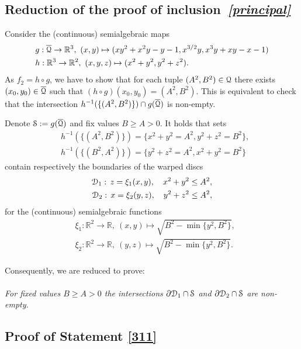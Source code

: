 \documentclass[10pt,twoside]{homg3} %
\newcommand{\Dd}{{\EuScript D}}
\newcommand{\Qq}{{\EuScript Q}}
\newcommand{\Ss}{{\EuScript S}}
\renewcommand{\R}{\mathbb{R}}
\begin{document}
\subsection{Reduction of the proof of inclusion~\em\eqref{principal}}
Consider the (continuous) semialgebraic maps 
\begin{align*}
&g:\overline{\Qq}\rightarrow\R^3,\ (x,y)\mapsto(xy^2+x^2y-y-1,x^{3/2}y,x^3y+xy-x-1)\\
&h:\R^3\rightarrow\R^2,\ (x,y,z)\mapsto(x^2+y^2,y^2+z^2). 
\end{align*}
As $f_2=h\circ g$, we have to show that for each tuple $(A^2,B^2)\in\Qq$ there exists $(x_0,y_0)\in\overline{\Qq}$ such that $(h\circ g)(x_0,y_0)=(A^2,B^2)$. This is equivalent to check that the intersection $h^{-1}(\{(A^2,B^2)\})\cap g(\overline{\Qq})$ is non-empty. 

Denote $\Ss:=g(\overline{\Qq})$ and fix values $B\ge A>0$. It holds that sets
\begin{align*}
&h^{-1}(\{(A^2,B^2)\})=\{x^2+y^2=A^2,y^2+z^2=B^2\},\\
&h^{-1}(\{(B^2,A^2)\})=\{y^2+z^2=A^2,x^2+y^2=B^2\}
\end{align*} 
contain respectively the boundaries of the warped discs
\begin{align}
\Dd_1:\,z=\xi_1(x,y),\quad x^2+y^2\le A^2,\label{d1}\\
\Dd_2:\,x=\xi_2(y,z),\quad y^2+z^2\le A^2,\label{d2}
\end{align}
for the (continuous) semialgebraic functions 
\begin{align}
&\xi_1:\R^2\to\R,\ (x,y)\mapsto\sqrt{B^2-\min\{y^2,B^2\}},\label{xi1}\\
&\xi_2:\R^2\to\R,\ (y,z)\mapsto\sqrt{B^2-\min\{y^2,B^2\}}.\label{xi2}
\end{align}

Consequently, we are reduced to prove:

\paragraph{}\hspace{-6mm}\label{311} {\em For fixed values $B\ge A>0$ the intersections $\partial\Dd_1\cap\Ss$ and $\partial\Dd_2\cap\Ss$ are non-empty.}


\subsection{Proof of Statement \ref{311}}
\end{document}
